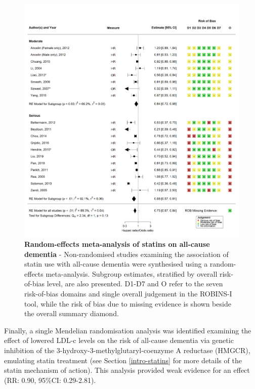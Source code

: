 \documentclass[a4paper, twoside]{templates/ociamthesis}
\begin{document}
\begin{figure}[H]
\includegraphics[width=1\linewidth]{figures/sys-rev/fp_obs_Statin-Ever_Dementia} \caption[Random-effects meta-analysis of statins on all-cause dementia]{\textbf{Random-effects meta-analysis of statins on all-cause dementia} - Non-randomised studies examining the association of statin use with all-cause dementia were synthesised using a random-effects meta-analysis. Subgroup estimates, stratified by overall risk-of-bias level, are also presented. D1-D7 and O refer to the seven risk-of-bias domains and single overall judgement in the ROBINS-I tool, while the risk of bias due to missing evidence is shown beside the overall summary diamond.}\label{fig:obsStatinDementiaFig}
\end{figure}

Finally, a single Mendelian randomisation analysis was identified examining the effect of lowered LDL-c levels on the risk of all-cause dementia via genetic inhibition of the 3-hydroxy-3-methylglutaryl-coenzyme A reductase (HMGCR), emulating statin treatment (see Section \ref{intro-statins} for more details of the statin mechanism of action). This analysis provided weak evidence for an effect (RR: 0.90, 95\%CI: 0.29-2.81).
\end{document}
